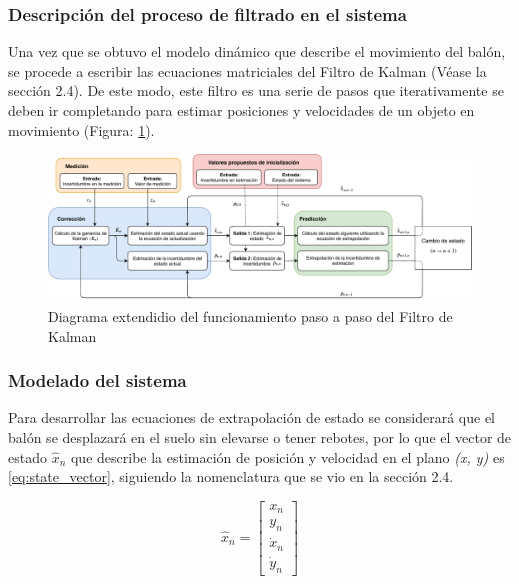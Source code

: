 		\subsubsection*{Descripción del proceso de filtrado en el sistema}
Una vez que se obtuvo el modelo dinámico que describe el movimiento del balón, se procede a escribir las ecuaciones matriciales del Filtro de Kalman (Véase la sección 2.4). De este modo, este filtro es una serie de pasos que iterativamente se deben ir completando para estimar posiciones y velocidades de un objeto en movimiento (Figura: \ref{fig:kalman_extended_diagram}).

\begin{figure}
\centering
\includegraphics[scale=0.6]{images/kalman_extended_diagram.pdf}
\caption{Diagrama extendidio del funcionamiento paso a paso del Filtro de Kalman}
\label{fig:kalman_extended_diagram}
\end{figure}

		\subsubsection*{Modelado del sistema}
Para desarrollar las ecuaciones de extrapolación de estado se considerará que el balón se desplazará en el suelo sin elevarse o tener rebotes, por lo que el vector de estado $\hat{x}_n$ que describe la estimación de posición y velocidad en el plano \textit{(x, y)} es \ref{eq:state_vector}, siguiendo la nomenclatura que se vio en la sección 2.4.

\begin{equation}
\hat{x}_n = \begin{bmatrix}
x_n\\ 
y_n\\ 
\dot{x}_n\\ 
\dot{y}_n
\end{bmatrix}
\label{eq:state_vector}
\end{equation}

